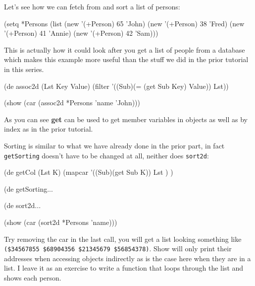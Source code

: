 Let's see how we can fetch from and sort a list of persons:

\begin{wideverbatim}
(setq *Persons (list 
               (new '(+Person) 65 'John) 
               (new '(+Person) 38 'Fred)
               (new '(+Person) 41 'Annie) 
               (new '(+Person) 42 'Sam)))
\end{wideverbatim}

This is actually how it could look after you get a list of people from a
database which makes this example more useful than the stuff we did in
the prior tutorial in this series.


\begin{wideverbatim}
(de assoc2d (Lst Key Value)
    (filter '((Sub)(= (get Sub Key) Value)) Lst))

(show (car (assoc2d *Persons 'name 'John)))
\end{wideverbatim}

As you can see \textbf{get} can be used to get member variables in objects as
well as by index as in the prior tutorial.

Sorting is similar to what we have already done in the prior part, in
fact \texttt{getSorting} doesn't have to be changed at all, neither
does \texttt{sort2d}:


\begin{wideverbatim}
(de getCol (Lst K) 
    (mapcar '((Sub)(get Sub K)) Lst ) ) 

(de getSorting...

(de sort2d...

(show (car (sort2d *Persons 'name)))
\end{wideverbatim}

Try removing the car in the last call, you will get a list looking
something like \texttt{(\$34567855 \$68904356 \$21345679 \$56854378)}.
Show will only print their addresses when accessing objects indirectly
as is the case here when they are in a list. I leave it as an exercise
to write a function that loops through the list and shows each person.

